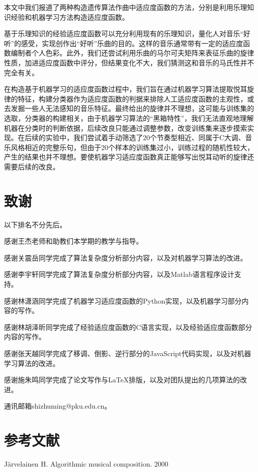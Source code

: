 \documentclass[UTF8,a4paper,10pt]{ctexart}
\begin{document}
    本文中我们报道了两种构造遗传算法作曲中适应度函数的方法，分别是利用乐理知识经验和机器学习方法构造适应度函数。\par
    基于乐理知识的经验适应度函数可以充分利用现有的乐理知识，量化人对音乐“好听”的感受，实现创作出“好听”乐曲的目的。这样的音乐通常带有一定的适应度函数编制者个人色彩。此外，我们还尝试利用乐曲的马尔可夫矩阵来表征乐曲的旋律性质，加进适应度函数中评分，但结果变化不大，我们猜测这和音乐的马氏性并不完全有关。\par
    在构造基于机器学习的适应度函数过程中，我们旨在通过机器学习算法提取悦耳旋律的特征，构建分类器作为适应度函数的判据来排除人工适应度函数的主观性，或去发掘一些人无法感知的音乐特征。最终给出的旋律并不理想，这可能与训练集的选取，分类器的构建相关，由于机器学习算法的“黑箱特性”，我们无法直观地理解机器在分类时的判断依据，后续改良只能通过调整参数，改变训练集来逐步摸索实现。在后续的实验中，我们尝试着手动筛选了20个节奏型相近、同属于C大调、音乐风格相近的完整乐句，但由于20个样本的训练集过小，训练过程的随机性较大，产生的结果也并不理想。要使机器学习适应度函数真正能够写出悦耳动听的旋律还需要后续的改良。

    \section{致谢}
    以下排名不分先后。\par 
    感谢王杰老师和助教们本学期的教学与指导。\par
    感谢关震岳同学完成了算法复杂度分析部分内容，以及对机器学习算法的改进。\par 
    感谢李宇轩同学完成了算法复杂度分析部分内容，以及Matlab语言程序设计支持。\par 
    感谢林潇涵同学完成了机器学习适应度函数的Python实现，以及机器学习部分内容的写作。\par
    感谢林胡泽昕同学完成了经验适应度函数的C语言实现，以及经验适应度函数部分内容的写作。\par
    感谢张天越同学完成了移调、倒影、逆行部分的JavaScript代码实现，以及对机器学习算法的改进。\par 
    感谢施朱鸣同学完成了论文写作与\LaTeX 排版，以及对团队提出的几项算法的改进。\par
    通讯邮箱shizhuming@pku.edu.cn。

    \section{参考文献}
    Järvelainen H. Algorithmic musical composition. 2000\\
\end{document}

